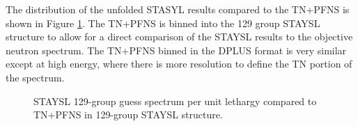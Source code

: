 The distribution of the unfolded STASYL results compared to the TN+PFNS is shown in Figure \ref{fig:unfold10}. The TN+PFNS is binned into the 129 group STAYSL structure to allow for a direct comparison of the STAYSL results to the objective neutron spectrum. 
The TN+PFNS binned in the DPLUS format is very similar except at high energy, where there is more resolution to define the TN portion of the spectrum. 

\begin{figure}[!htbp]
	\centering
	\vfill
	\vfill
	\vfill
	\caption{STAYSL 129-group guess spectrum per unit lethargy compared to TN+PFNS in 129-group STAYSL structure.}
	\label{fig:unfold10}
\end{figure}

